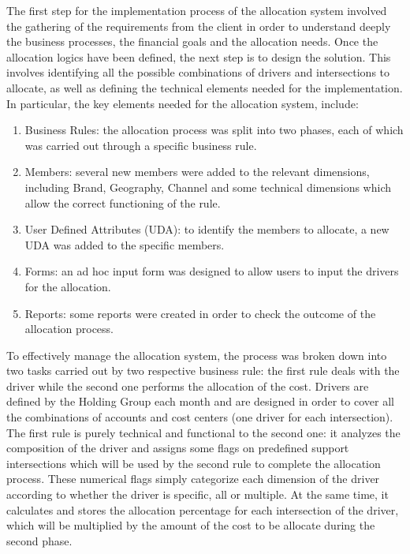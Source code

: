 \documentclass[12pt,a4paper,openright,twoside]{book}
\begin{document}
The first step for the implementation process of the allocation system involved the gathering of the requirements from the client in order to understand deeply the business processes, the financial goals and the allocation needs.
%
Once the allocation logics have been defined, the next step is to design the solution.
%
This involves identifying all the possible combinations of drivers and intersections to allocate, as well as defining the technical elements needed for the implementation.
%
In particular, the key elements needed for the allocation system, include:

\begin{enumerate}
    \item Business Rules: the allocation process was split into two phases, each of which was carried out through a specific business rule.
    \item Members: several new members were added to the relevant dimensions, including Brand, Geography, Channel and some technical dimensions which allow the correct functioning of the rule.
    \item User Defined Attributes (UDA): to identify the members to allocate, a new UDA was added to the specific members.
    \item Forms: an ad hoc input form was designed to allow users to input the drivers for the allocation.
    \item Reports: some reports were created in order to check the outcome of the allocation process.
\end{enumerate}

To effectively manage the allocation system, the process was broken down into two tasks carried out by two respective business rule: the first rule deals with the driver while the second one performs the allocation of the cost.
%
Drivers are defined by the Holding Group each month and are designed in order to cover all the combinations of accounts and cost centers (one driver for each intersection).
%
The first rule is purely technical and functional to the second one: it analyzes the composition of the driver and assigns some flags on predefined support intersections which will be used by the second rule to complete the allocation process.
%
These numerical flags simply categorize each dimension of the driver according to whether the driver is specific, all or multiple.
%
At the same time, it calculates and stores the allocation percentage for each intersection of the driver, which will be multiplied by the amount of the cost to be allocate during the second phase.
\end{document}
